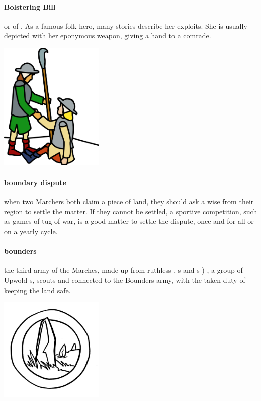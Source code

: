 \paragraph{Bolstering Bill} or   of . As a famous folk hero, many stories describe her exploits. She is usually depicted with her eponymous weapon, giving a hand to a comrade. \begin{center}\includegraphics[width=5cm]{encyclopedia/Wilhelmina} \end{center}
\paragraph{boundary dispute} when two Marchers both claim a piece of land, they should ask a wise  from their region to settle the matter. If they cannot be settled, a sportive competition, such as games of tug-of-war, is a good matter to settle the dispute, once and for all or on a yearly cycle.
\paragraph{bounders}  the third army of the Marches, made up from ruthless  , s and s  ) , a group of Upwold s, scouts and  connected to the Bounders army, with the taken duty of keeping the land safe. \begin{center}\includegraphics[width=5cm]{encyclopedia/TheBounders}\end{center}
